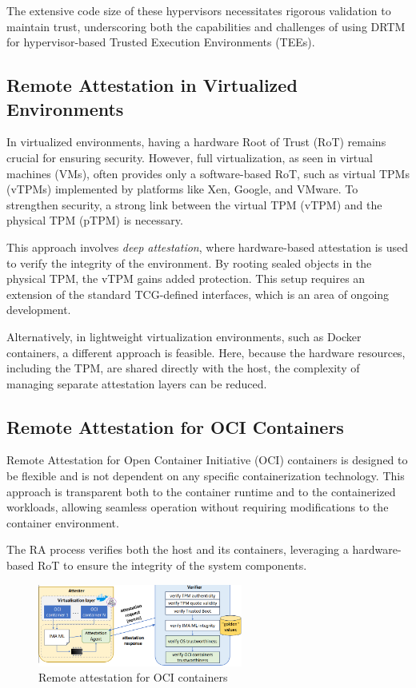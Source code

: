 The extensive code size of these hypervisors necessitates rigorous
validation to maintain trust, underscoring both the capabilities and
challenges of using DRTM for hypervisor-based Trusted Execution
Environments (TEEs).

\subsection{Remote Attestation in Virtualized Environments}

In virtualized environments, having a hardware Root of Trust (RoT)
remains crucial for ensuring security. However, full virtualization,
as seen in virtual machines (VMs), often provides only a
software-based RoT, such as virtual TPMs (vTPMs) implemented by
platforms like Xen, Google, and VMware. To strengthen security, a
strong link between the virtual TPM (vTPM) and the physical TPM (pTPM)
is necessary.

This approach involves \textit{deep attestation}, where hardware-based
attestation is used to verify the integrity of the environment. By
rooting sealed objects in the physical TPM, the vTPM gains added
protection. This setup requires an extension of the standard
TCG-defined interfaces, which is an area of ongoing development.

Alternatively, in lightweight virtualization environments, such as
Docker containers, a different approach is feasible. Here, because the
hardware resources, including the TPM, are shared directly with the
host, the complexity of managing separate attestation layers can be
reduced.

\subsection{Remote Attestation for OCI Containers}

Remote Attestation for Open Container Initiative (OCI) containers
is designed to be flexible and is not dependent on any specific
containerization technology. This approach is transparent both to the
container runtime and to the containerized workloads, allowing
seamless operation without requiring modifications to the container
environment.

The RA process verifies both the host and its containers, leveraging a
hardware-based RoT to ensure the integrity of the system components.

\begin{figure}[H]
  \centering
  \includegraphics[width=0.6\textwidth]{img/container OCI .png}
  \caption{Remote attestation for OCI containers}
\end{figure}


